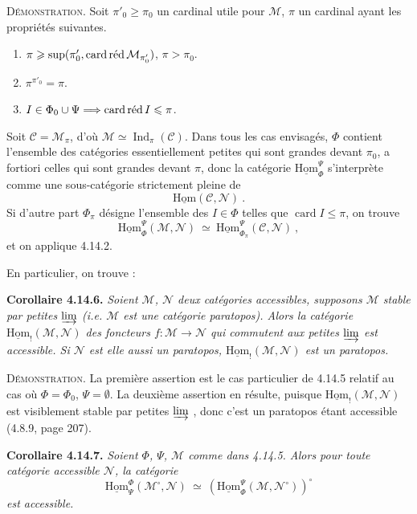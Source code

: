 \documentclass[11pt]{article}
\newcommand{\printedpage}[1]{\marginpar{\footnotesize p.~#1}}
\newcommand{\msp}[1]{\marginpar{\footnotesize [#1]}}
\newcommand{\uHom}{\underline{\mathrm{Hom}}}
\newcommand{\Ind}{\operatorname{Ind}}
\newcommand{\cardred}{\mathop{\textup{card\,réd}}}
\newcommand{\card}{\operatorname{card}}
\begin{document}
\msp{page 376}

\noindent\textsc{Démonstration}. Soit $\pi'_0\geqslant\pi_0$ un cardinal utile pour $\mathcal{M}$, $\pi$ un cardinal ayant les propriétés suivantes.
\begin{enumerate}[leftmargin=2.5em]
\item[a)] $\pi\geqslant\sup(\pi'_0,\cardred\mathcal{M}_{\pi'_0})$, $\pi>\pi_0$.
\item[b)] $\pi^{\pi'_0}=\pi$.
\item[c)] $I\in\Phi_0\cup\Psi\Longrightarrow\cardred I\leqslant\pi$.
\end{enumerate}
\noindent Soit $\mathcal{C}=\mathcal{M}_\pi$, d'où $\mathcal{M}\simeq\Ind_\pi(\mathcal{C})$. Dans tous les cas envisagés, $\Phi$ contient l'ensemble des catégories essentiellement petites qui sont grandes devant $\pi_0$, a fortiori celles qui sont grandes devant $\pi$, donc la catégorie $\uHom^{\Psi}_{\Phi}$ s'interprète comme une sous-catégorie strictement pleine de
\[
\uHom(\mathcal{C},\mathcal{N})\ .
\]
Si d'autre part $\Phi_\pi$ désigne l'ensemble des $I\in\Phi$ telles que $\card I\leqslant\pi$, on trouve
\[
\uHom^{\Psi}_{\Phi}(\mathcal{M},\mathcal{N})\ \simeq\ \uHom^{\Psi}_{\Phi_\pi}(\mathcal{C},\mathcal{N})\ ,
\]
et on applique 4.14.2.

\printedpage{143}
\msp{page 377}

En particulier, on trouve :

\noindent\textbf{Corollaire 4.14.6.} {\itshape Soient $\mathcal{M}$, $\mathcal{N}$ deux catégories accessibles, supposons $\mathcal{M}$ stable par petites $\varinjlim$ (i.e. $\mathcal{M}$ est une catégorie paratopos). Alors la catégorie $\uHom_{!}(\mathcal{M},\mathcal{N})$ des foncteurs $f:\mathcal{M}\longrightarrow\mathcal{N}$ qui commutent aux petites $\varinjlim$ est accessible. Si $\mathcal{N}$ est elle aussi un paratopos, $\uHom_{!}(\mathcal{M},\mathcal{N})$ est un paratopos.}

\noindent\textsc{Démonstration}. La première assertion est le cas particulier de 4.14.5 relatif au cas où $\Phi=\Phi_0$, $\Psi=\emptyset$. La deuxième assertion en résulte, puisque $\uHom_{!}(\mathcal{M},\mathcal{N})$ est visiblement stable par petites $\varinjlim$ , donc c'est un paratopos étant accessible (4.8.9, page 207).

\noindent\textbf{Corollaire 4.14.7.} {\itshape Soient $\Phi$, $\Psi$, $\mathcal{M}$ comme dans 4.14.5. Alors pour toute catégorie accessible $\mathcal{N}$, la catégorie
\msp{page 378}
\[
\uHom^{\Phi}_{\Psi}(\mathcal{M}^{\circ},\mathcal{N})\ \simeq\ (\uHom^{\Psi}_{\Phi}(\mathcal{M},\mathcal{N}^{\circ}))^{\circ}
\]
est accessible.}
\end{document}
